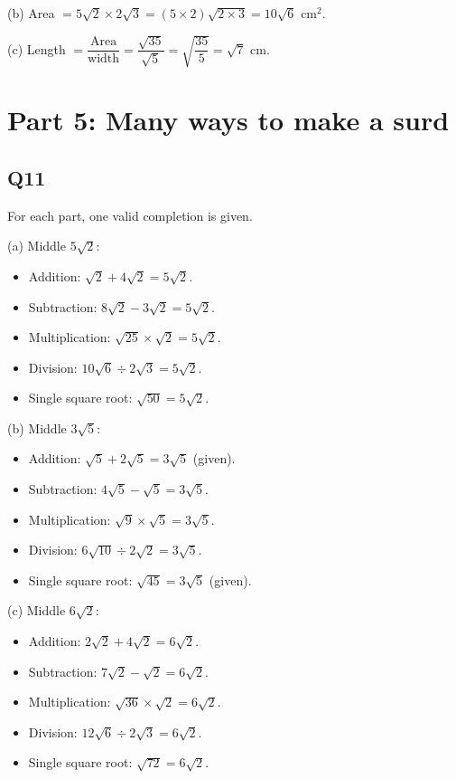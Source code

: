 \documentclass[12pt,a4paper]{article}
\begin{document}
(b) Area $= 5\sqrt2\times2\sqrt3 = (5\times2)\sqrt{2\times3} = 10\sqrt6$ cm$^2$.

(c) Length $= \dfrac{\text{Area}}{\text{width}} = \dfrac{\sqrt{35}}{\sqrt5} = \sqrt{\dfrac{35}{5}} = \sqrt7$ cm.

\section*{Part 5: Many ways to make a surd}

\subsection*{Q11}
For each part, one valid completion is given.

(a) Middle $5\sqrt2$:
\begin{itemize}
\item Addition: $\sqrt2+4\sqrt2 = 5\sqrt2$.
\item Subtraction: $8\sqrt2-3\sqrt2 = 5\sqrt2$.
\item Multiplication: $\sqrt{25}\times\sqrt2 = 5\sqrt2$.
\item Division: $10\sqrt6\div2\sqrt3 = 5\sqrt2$.
\item Single square root: $\sqrt{50} = 5\sqrt2$.
\end{itemize}

(b) Middle $3\sqrt5$:
\begin{itemize}
\item Addition: $\sqrt5+2\sqrt5 = 3\sqrt5$ (given).
\item Subtraction: $4\sqrt5-\sqrt5 = 3\sqrt5$.
\item Multiplication: $\sqrt9\times\sqrt5 = 3\sqrt5$.
\item Division: $6\sqrt{10}\div2\sqrt2 = 3\sqrt5$.
\item Single square root: $\sqrt{45} = 3\sqrt5$ (given).
\end{itemize}

(c) Middle $6\sqrt2$:
\begin{itemize}
\item Addition: $2\sqrt2+4\sqrt2 = 6\sqrt2$.
\item Subtraction: $7\sqrt2-\sqrt2 = 6\sqrt2$.
\item Multiplication: $\sqrt{36}\times\sqrt2 = 6\sqrt2$.
\item Division: $12\sqrt6\div2\sqrt3 = 6\sqrt2$.
\item Single square root: $\sqrt{72} = 6\sqrt2$.
\end{itemize}
\end{document}
